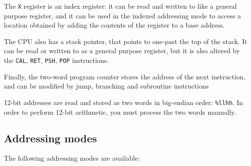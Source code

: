 \documentclass[a5paper,onecolumn,final,10pt]{memoir}
\let\ttt\texttt
\begin{document}
The \ttt{X} register is an index register: it can be read and written to like a general purpose register, 
and it can be used in the indexed addressing mode to access a location obtained by adding the contents of the register to a base address. 

The CPU also has a stack pointer, that points to one-past the top of the stack. 
It can be read or written to as a general purpose register, but it is also altered by the \ttt{CAL}, \ttt{RET}, \ttt{PSH}, \ttt{POP} instructions. 

Finally, the two-word program counter stores the address of the next instruction, and can be modified by jump, branching and subroutine instructions

12-bit addresses are read and stored as two words in big-endian order: \ttt{\%llhh}.
In order to perform 12-bit arithmetic, you must process the two words manually.\footnotemark


\subsection*{Addressing modes}

The following addressing modes are available:

\end{document}
